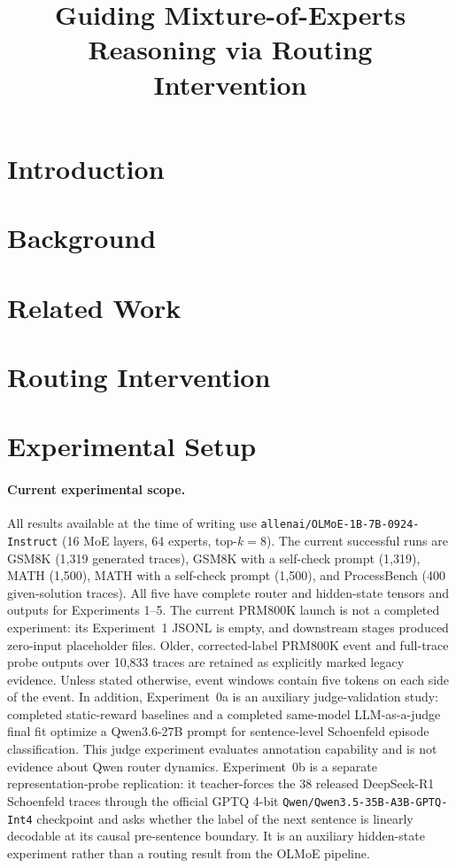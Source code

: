 \documentclass[manuscript,screen,review]{jair}
\begin{document}
\title{Guiding Mixture-of-Experts Reasoning via Routing Intervention}

\maketitle

\section{Introduction}

\section{Background}

\section{Related Work}

\section{Routing Intervention}

\section{Experimental Setup}

\paragraph{Current experimental scope.}
All results available at the time of writing use
\texttt{allenai/OLMoE-1B-7B-0924-Instruct} (16 MoE layers, 64 experts,
top-$k=8$).  The current successful runs are GSM8K (1,319 generated traces),
GSM8K with a self-check prompt (1,319), MATH (1,500), MATH with a self-check
prompt (1,500), and ProcessBench (400 given-solution traces).  All five have
complete router and hidden-state tensors and outputs for Experiments 1--5.
The current PRM800K launch is not a completed experiment: its Experiment~1
JSONL is empty, and downstream stages produced zero-input placeholder files.
Older, corrected-label PRM800K event and full-trace probe outputs over 10,833
traces are retained as explicitly marked legacy evidence.  Unless stated
otherwise, event windows contain five tokens on each side of the event.
In addition, Experiment~0a is an auxiliary judge-validation study: completed
static-reward baselines and a completed same-model LLM-as-a-judge final fit
optimize a Qwen3.6-27B prompt for sentence-level Schoenfeld episode
classification.  This judge experiment evaluates annotation capability and is
not evidence about Qwen router dynamics.  Experiment~0b is
a separate representation-probe replication: it teacher-forces the 38
released DeepSeek-R1 Schoenfeld traces through the official GPTQ 4-bit
\texttt{Qwen/Qwen3.5-35B-A3B-GPTQ-Int4} checkpoint and asks whether the label
of the next sentence is linearly decodable at its causal pre-sentence
boundary.  It is an auxiliary hidden-state experiment rather than a routing
result from the OLMoE pipeline.
\end{document}
